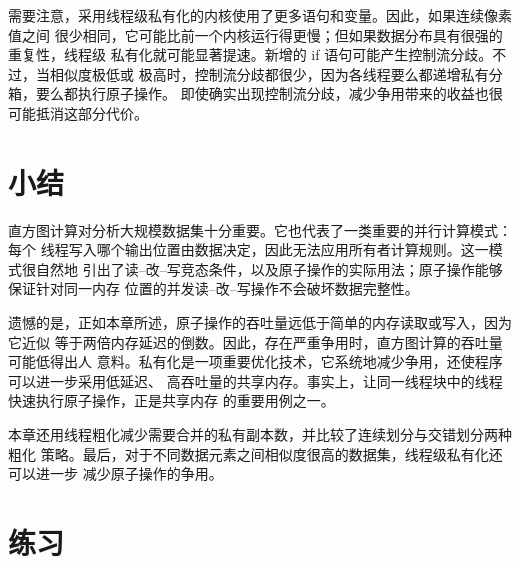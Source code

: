 需要注意，采用线程级私有化的内核使用了更多语句和变量。因此，如果连续像素值之间
很少相同，它可能比前一个内核运行得更慢；但如果数据分布具有很强的重复性，线程级
私有化就可能显著提速。新增的 if 语句可能产生控制流分歧。不过，当相似度极低或
极高时，控制流分歧都很少，因为各线程要么都递增私有分箱，要么都执行原子操作。
即使确实出现控制流分歧，减少争用带来的收益也很可能抵消这部分代价。

\section{小结}
\label{sec:histogram-summary}

直方图计算对分析大规模数据集十分重要。它也代表了一类重要的并行计算模式：每个
线程写入哪个输出位置由数据决定，因此无法应用所有者计算规则。这一模式很自然地
引出了读--改--写竞态条件，以及原子操作的实际用法；原子操作能够保证针对同一内存
位置的并发读--改--写操作不会破坏数据完整性。

遗憾的是，正如本章所述，原子操作的吞吐量远低于简单的内存读取或写入，因为它近似
等于两倍内存延迟的倒数。因此，存在严重争用时，直方图计算的吞吐量可能低得出人
意料。私有化是一项重要优化技术，它系统地减少争用，还使程序可以进一步采用低延迟、
高吞吐量的共享内存。事实上，让同一线程块中的线程快速执行原子操作，正是共享内存
的重要用例之一。

本章还用线程粗化减少需要合并的私有副本数，并比较了连续划分与交错划分两种粗化
策略。最后，对于不同数据元素之间相似度很高的数据集，线程级私有化还可以进一步
减少原子操作的争用。

\section*{练习}

